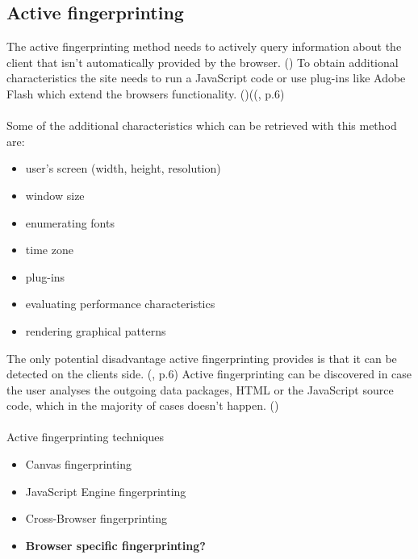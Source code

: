 \subsection{Active fingerprinting}
The active fingerprinting method needs to actively query information about the client that isn't automatically provided by the browser. (\textcite{web17}) To obtain additional characteristics the site needs to run a JavaScript code or use plug-ins like Adobe Flash which extend the browsers functionality. (\textcite{web17})((\textcite{doty18}, p.6)\\\\
Some of the additional characteristics which can be retrieved with this method are:
\begin{itemize}
	\item user's screen (width, height, resolution)
	\item window size
	\item enumerating fonts
	\item time zone
	\item plug-ins
	\item evaluating performance characteristics
	\item rendering graphical patterns\\
\end{itemize}
The only potential disadvantage active fingerprinting provides is that it can be detected on the clients side. (\textcite{doty18}, p.6) Active fingerprinting can be discovered in case the user analyses the outgoing data packages, HTML or the JavaScript source code, which in the majority of cases doesn't happen. (\textcite{web17})\\\\
Active fingerprinting techniques
\begin{itemize}
	\item Canvas fingerprinting
	\item JavaScript Engine fingerprinting
	\item Cross-Browser fingerprinting
	\item \textbf{Browser specific fingerprinting?}
\end{itemize}

